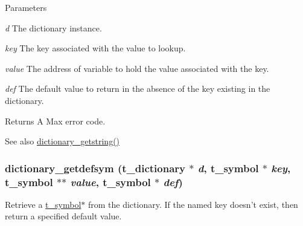 \begin{DoxyParams}{Parameters}
\item[{\em d}]The dictionary instance. \item[{\em key}]The key associated with the value to lookup. \item[{\em value}]The address of variable to hold the value associated with the key. \item[{\em def}]The default value to return in the absence of the key existing in the dictionary. \end{DoxyParams}
\begin{DoxyReturn}{Returns}
A Max error code.
\end{DoxyReturn}
\begin{DoxySeeAlso}{See also}
\hyperlink{group__dictionary_gaee590f1bcea90856a26e5806637c2830}{dictionary\_\-getstring()} 
\end{DoxySeeAlso}
\hypertarget{group__dictionary_ga2bf7497a4db16913aedb8c85036bf8c6}{
\subsubsection[{dictionary\_\-getdefsym}]{ dictionary\_\-getdefsym ({\bf t\_\-dictionary} $\ast$ {\em d}, \/  {\bf t\_\-symbol} $\ast$ {\em key}, \/  {\bf t\_\-symbol} $\ast$$\ast$ {\em value}, \/  {\bf t\_\-symbol} $\ast$ {\em def})}}
\label{group__dictionary_ga2bf7497a4db16913aedb8c85036bf8c6}


Retrieve a \hyperlink{structt__symbol}{t\_\-symbol}$\ast$ from the dictionary. If the named key doesn't exist, then return a specified default value.


